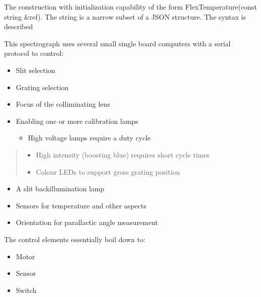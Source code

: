 \documentclass[letterpaper,10pt,english,openany,oneside]{sphinxmanual}
\begin{document}
\sphinxAtStartPar
The construction with initialization capability of the form
FlexTemperature(const string \&ref). The string is a narrow
subset of a JSON structure. The syntax is described

\sphinxAtStartPar
This spectrograph uses several small single board computers with a serial
protocol to control:
\begin{itemize}
\item {} 
\sphinxAtStartPar
Slit selection

\item {} 
\sphinxAtStartPar
Grating selection

\item {} 
\sphinxAtStartPar
Focus of the colliminating lens

\item {} 
\sphinxAtStartPar
Enabling one or more calibration lamps
\begin{itemize}
\item {} 
\sphinxAtStartPar
High voltage lamps require a duty cycle

\end{itemize}

\end{itemize}
\begin{quote}
\begin{itemize}
\item {} 
\sphinxAtStartPar
High intensity (boosting blue) requires short cycle times

\end{itemize}
\begin{itemize}
\item {} 
\sphinxAtStartPar
Colour LEDs to support gross grating position

\end{itemize}
\end{quote}
\begin{itemize}
\item {} 
\sphinxAtStartPar
A slit back\sphinxhyphen{}illumination lamp

\item {} 
\sphinxAtStartPar
Sensors for temperature and other aspects

\item {} 
\sphinxAtStartPar
Orientation for parallactic angle measurement

\end{itemize}

\sphinxAtStartPar
The control elements essentially boil down to:
\begin{itemize}
\item {} 
\sphinxAtStartPar
Motor

\item {} 
\sphinxAtStartPar
Sensor

\item {} 
\sphinxAtStartPar
Switch

\end{itemize}
\end{document}
